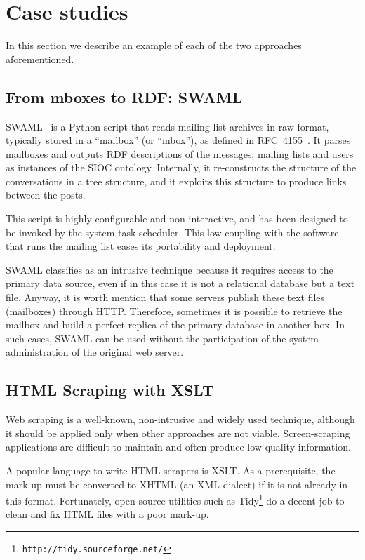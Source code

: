 \documentclass{../templates/www2008-submission}
\begin{document}
\section{Case studies}\label{sec:case-studies}

In this section we describe an example of each of the two approaches
aforementioned.

\subsection{From mboxes to RDF: SWAML}

SWAML~\cite{SWAML2007} is a Python script that reads mailing 
list archives in raw format, typically stored in a ``mailbox'' 
(or ``mbox''), as defined in RFC~4155~\cite{RFC4155}. It parses
mailboxes and outputs RDF descriptions of the messages, mailing lists
and users as instances of the SIOC ontology. Internally, it re-constructs
the structure of the conversations in a tree structure, and it exploits
this structure to produce links between the posts.

This script is highly configurable and non-interactive, and has been
designed to be invoked by the system task scheduler. This low-coupling with
the software that runs the mailing list eases its portability and
deployment.

SWAML classifies as an intrusive technique because
it requires access to the primary data source, even if in this case
it is not a relational database but a text file. Anyway, it is
worth mention that some servers publish these text files
(mailboxes) through HTTP. Therefore, sometimes it is possible to
retrieve the mailbox and build a perfect replica of the primary
database in another box. In such cases, SWAML can be used without the
participation of the system administration of the original
web server.

\subsection{HTML Scraping with XSLT}

Web scraping is a well-known, non-intrusive and widely used technique,
although it should be applied only when other approaches are not viable.
Screen-scraping applications are difficult to maintain and
often produce low-quality information.

A popular language to write HTML scrapers is XSLT. As a prerequisite,
the mark-up must be converted to XHTML (an XML dialect) if it is not
already in this format. Fortunately, open source utilities such as
Tidy\footnote{\texttt{http://tidy.sourceforge.net/}} do a decent job
to clean and fix HTML files with a poor mark-up.
\end{document}
